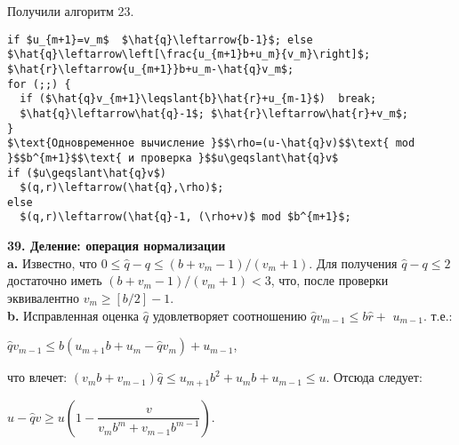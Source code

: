 \noindent
Получили алгоритм 23.
\begin{lstlisting}[mathescape=true, caption={Частные и остатки от деления $(u_{m+1}...u_0)$ на $(v_m...v_0)$, где $u/v<b. n\geqslant1$}]
if $u_{m+1}=v_m$  $\hat{q}\leftarrow{b-1}$; else  $\hat{q}\leftarrow\left[\frac{u_{m+1}b+u_m}{v_m}\right]$;
$\hat{r}\leftarrow{u_{m+1}}b+u_m-\hat{q}v_m$;
for (;;) {
  if ($\hat{q}v_{m+1}\leqslant{b}\hat{r}+u_{m-1}$)  break;
  $\hat{q}\leftarrow\hat{q}-1$; $\hat{r}\leftarrow\hat{r}+v_m$;
}
$\text{Одновременное вычисление }$$\rho=(u-\hat{q}v)$$\text{ mod }$$b^{m+1}$$\text{ и проверка }$$u\geqslant\hat{q}v$
if ($u\geqslant\hat{q}v$)
  $(q,r)\leftarrow(\hat{q},\rho)$;
else
  $(q,r)\leftarrow(\hat{q}-1, (\rho+v)$ mod $b^{m+1}$;
\end{lstlisting}
\textbf{39. Деление: операция нормализации}\\
\hspace*{15pt}\textbf{a.} Известно, что $0\leqslant\hat{q}-q\leqslant(b+v_m-1)/(v_m+1)$. Для получения\linebreak
$\hat{q}-q\leqslant2$ достаточно иметь $(b+v_m-1)/(v_m+1)<3$, что, после проверки\linebreak
эквивалентно $v_m\geqslant[b/2]-1$.\\

\textbf{b.} Исправленная оценка $\hat{q}$ удовлетворяет соотношению $\hat{q}v_{m-1}\leqslant{b}\hat{r}+$\linebreak
$u_{m-1}$. т.е.:
\begin{center}
$\hat{q}v_{m-1}\leqslant{b}(u_{m+1}b+u_m-\hat{q}v_m)+u_{m-1}$,
\end{center}
что влечет: $(v_mb+v_{m-1})\hat{q}\leqslant{u_{m+1}}b^2+u_mb+u_{m-1}\leqslant{u}$. Отсюда следует:\linebreak
\begin{center}
$u-\hat{q}v\geqslant{u(1-\dfrac{v}{v_mb^m+v_{m-1}b^{m-1}})}$.
\end{center}
